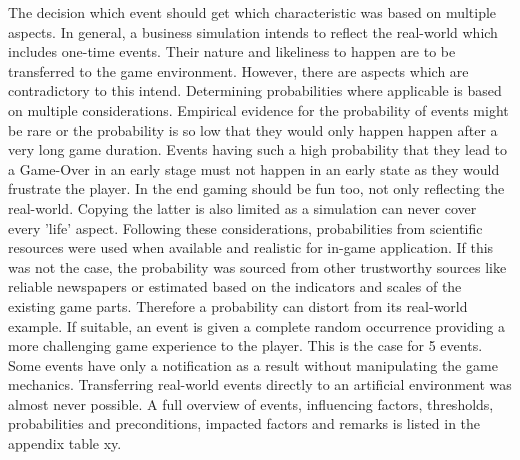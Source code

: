 \documentclass[11pt,titlepage,oneside,openany]{book}
\begin{document}
The decision which event should get which characteristic was based on multiple aspects. In general, a business simulation intends to reflect the real-world which includes one-time events. Their nature and likeliness to happen are to be transferred to the game environment. However, there are aspects which are contradictory to this intend.
Determining probabilities where applicable is based on multiple considerations. Empirical evidence for the probability of events might be rare or the probability is so low that they would only happen happen after a very long game duration. Events having such a high probability that they lead to a Game-Over in an early stage must not happen in an early state as they would frustrate the player. In the end gaming should be fun too, not only reflecting the real-world. Copying the latter is also limited as a simulation can never cover every 'life' aspect.  Following these considerations, probabilities from scientific resources were used when available and realistic for in-game application. If this was not the case, the probability was sourced from other trustworthy sources like reliable newspapers or estimated based on the indicators and scales of the existing game parts. Therefore a probability can distort from its real-world example. If suitable, an event is given a complete random occurrence providing a more challenging game experience to the player. This is the case for 5 events. Some events have only a notification as a result without manipulating the game mechanics. Transferring real-world events directly to an artificial environment was almost never possible. A full overview of events, influencing factors, thresholds, probabilities and preconditions, impacted factors and remarks is listed in the appendix table xy. 
\end{document}
